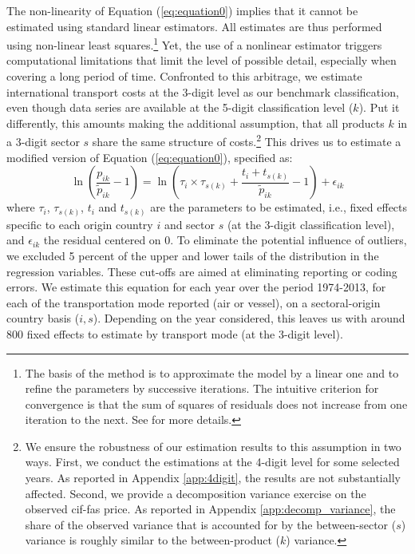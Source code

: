 \documentclass[a4paper,11pt]{article}
\begin{document}
The non-linearity of Equation (\ref{eq:equation0}) implies that it cannot be estimated using standard linear estimators. All estimates are thus performed using non-linear least squares.\footnote{The basis of the method is to approximate the model by a linear one and to refine the parameters by successive iterations. The intuitive criterion for convergence is that the sum of squares of residuals does not increase from one iteration to the next. See \cite{Woolridge-Book-2001} for more details.} Yet, the use of a nonlinear estimator triggers computational limitations that limit the level of possible detail, especially when covering a long period of time. Confronted to this arbitrage, we estimate international transport costs at the 3-digit level as our benchmark classification, even though data series are available at the 5-digit classification level ($k$). Put it differently, this amounts making the additional assumption, that all products $k$ in a 3-digit sector $s$ share the
same structure of costs.\footnote{We ensure the robustness of our estimation results to this assumption in two ways. First, we conduct the estimations at the 4-digit level for some selected years. As reported in Appendix \ref{app:4digit}, the results are not substantially affected. Second, we provide a decomposition variance exercise on the observed cif-fas price. As reported in Appendix \ref{app:decomp_variance}, the share of the observed variance that is accounted for by the between-sector ($s$) variance is roughly similar to the between-product ($k$) variance.} This drives us to estimate a modified version of Equation (\ref{eq:equation0}), specified as:
\begin{equation}
\ln\left(\frac{p_{ik}}{\widetilde{p}_{ik}}-1 \right)= \ln \left(\tau_{i} \times \tau_{s(k)}+\frac{t_{i} + t_{s(k)}}{\widetilde{p}_{ik}}-1 \right) + \epsilon_{ik} \label{eq:estimatedequation}
\end{equation}
where $\tau_{i}$, $\tau_{s(k)}$, $t_{i}$ and $t_{s(k)}$ are the parameters to be estimated, i.e., fixed effects specific to each origin country $i$ and sector $s$ (at the 3-digit classification level), and $\epsilon_{ik}$ the residual centered on 0. To eliminate the potential influence of outliers, we excluded 5 percent of the upper and lower tails of the distribution in the regression variables. These cut-offs are aimed at eliminating reporting or coding errors. We estimate this equation for each year over the period 1974-2013, for each of the transportation mode reported (air or vessel), on a sectoral-origin country basis ($i,s$). Depending on the year considered, this leaves us with around 800 fixed effects to estimate by transport mode (at the 3-digit level).   \smallskip
\end{document}
